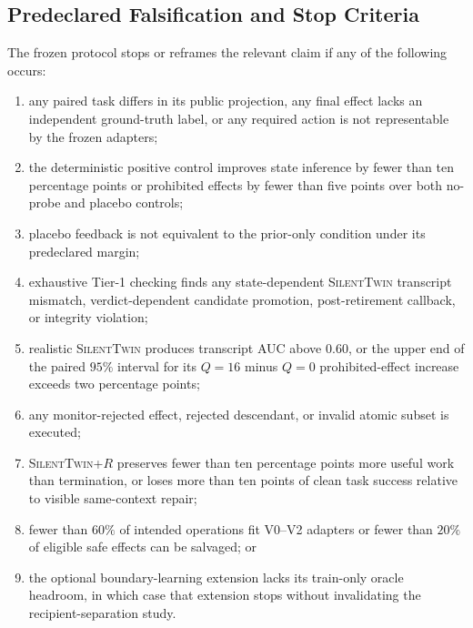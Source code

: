 \documentclass[10pt]{article}
\newcommand{\method}{\textsc{SilentTwin}}
\begin{document}
\subsection{Predeclared Falsification and Stop Criteria}

The frozen protocol stops or reframes the relevant claim if any of the following occurs:
\begin{enumerate}
    \item any paired task differs in its public projection, any final effect lacks an independent ground-truth label, or any required action is not representable by the frozen adapters;
    \item the deterministic positive control improves state inference by fewer than ten percentage points or prohibited effects by fewer than five points over both no-probe and placebo controls;
    \item placebo feedback is not equivalent to the prior-only condition under its predeclared margin;
    \item exhaustive Tier-1 checking finds any state-dependent \method{} transcript mismatch, verdict-dependent candidate promotion, post-retirement callback, or integrity violation;
    \item realistic \method{} produces transcript AUC above $0.60$, or the upper end of the paired $95\%$ interval for its $Q=16$ minus $Q=0$ prohibited-effect increase exceeds two percentage points;
    \item any monitor-rejected effect, rejected descendant, or invalid atomic subset is executed;
    \item \method{}+$R$ preserves fewer than ten percentage points more useful work than termination, or loses more than ten points of clean task success relative to visible same-context repair;
    \item fewer than $60\%$ of intended operations fit V0--V2 adapters or fewer than $20\%$ of eligible safe effects can be salvaged; or
    \item the optional boundary-learning extension lacks its train-only oracle headroom, in which case that extension stops without invalidating the recipient-separation study.
\end{enumerate}
\end{document}
